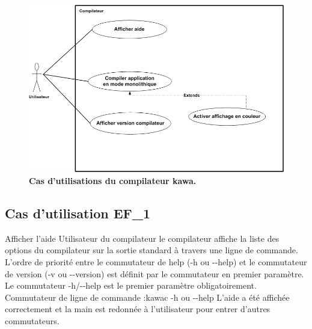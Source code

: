 \begin{figure}
  \centering
  \includegraphics[scale=0.5]{../res/stb/UseCase_AfterChange.png}
  \caption{\textbf{Cas d'utilisations du compilateur kawa.}}
\end{figure}

\subsection{Cas d'utilisation EF\_1}
\fiche
{Afficher l'aide}                    %
{Utilisateur du compilateur}                               %
{                                                %
  le compilateur affiche 
   la liste des options du compilateur sur la sortie standard à travers une ligne de commande.
}
{
  L'ordre de priorité entre le commutateur de help (-h ou -\hspace{0.1mm}-help) et le commutateur de version (-v ou -\hspace{0.1mm}-version) est définit par le commutateur en premier paramètre. Le commutateur -h/-\hspace{0.1mm}-help est le premier paramètre obligatoirement.
}                                                %
{Commutateur de ligne de commande :kawac -h ou -\hspace{0.1mm}-help }                             %
{L'aide a été affichée correctement et la main est redonnée à l'utilisateur pour entrer d'autres commutateurs.}                       %
{} %
{} %
{} %


